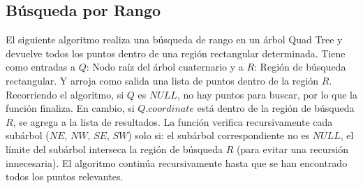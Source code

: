 \documentclass[9pt,a4paper,twoside]{rho-class/rho}
\begin{document}
        \subsection{Búsqueda por Rango}
            El siguiente algoritmo realiza una búsqueda de rango en un árbol Quad Tree y devuelve todos los puntos dentro de una región rectangular determinada. Tiene como entradas a $Q$: Nodo raíz del árbol cuaternario y a $R$: Región de búsqueda rectangular. Y arroja como salida una lista de puntos dentro de la región $R$.
            Recorriendo el algoritmo, si $Q$ es $NULL$, no hay puntos para buscar, por lo que la función finaliza. En cambio, si $Q.coordinate$ está dentro de la región de búsqueda $R$, se agrega a la lista de resultados. La función verifica recursivamente cada subárbol ($NE$, $NW$, $SE$, $SW$) solo si: el subárbol correspondiente no es $NULL$, el límite del subárbol interseca la región de búsqueda $R$ (para evitar una recursión innecesaria). El algoritmo continúa recursivamente hasta que se han encontrado todos los puntos relevantes.\cite{samet_spatial_structures}
\end{document}
